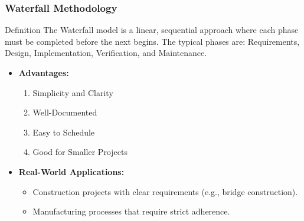 \documentclass{beamer}
\begin{document}
\begin{frame}[fragile]
    \frametitle{Waterfall Methodology}
    
    \begin{block}{Definition}
        The Waterfall model is a linear, sequential approach where each phase must be completed before the next begins. The typical phases are: Requirements, Design, Implementation, Verification, and Maintenance.
    \end{block}

    \begin{itemize}
        \item \textbf{Advantages:}
        \begin{enumerate}
            \item Simplicity and Clarity
            \item Well-Documented
            \item Easy to Schedule
            \item Good for Smaller Projects
        \end{enumerate}
        
        \item \textbf{Real-World Applications:}
        \begin{itemize}
            \item Construction projects with clear requirements (e.g., bridge construction).
            \item Manufacturing processes that require strict adherence.
        \end{itemize}
    \end{itemize}
\end{frame}
\end{document}
